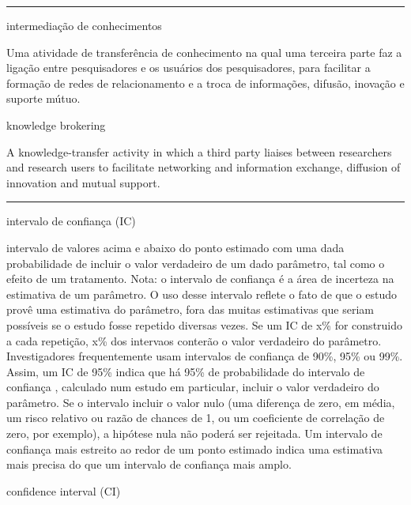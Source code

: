 \documentclass[
]{book}
\begin{document}
\begin{center}\rule{0.5\linewidth}{0.5pt}\end{center}

intermediação de conhecimentos

Uma atividade de transferência de conhecimento na qual uma terceira parte faz a ligação entre pesquisadores e os usuários dos pesquisadores, para facilitar a formação de redes de relacionamento e a troca de informações, difusão, inovação e suporte mútuo.

knowledge brokering

A knowledge-transfer activity in which a third party liaises between researchers and research users to facilitate networking and information exchange, diffusion of innovation and mutual support.

\begin{center}\rule{0.5\linewidth}{0.5pt}\end{center}

intervalo de confiança (IC)

intervalo de valores acima e abaixo do ponto estimado com uma dada probabilidade de incluir o valor verdadeiro de um dado parâmetro, tal como o efeito de um tratamento. Nota: o intervalo de confiança é a área de incerteza na estimativa de um parâmetro. O uso desse intervalo reflete o fato de que o estudo provê uma estimativa do parâmetro, fora das muitas estimativas que seriam possíveis se o estudo fosse repetido diversas vezes. Se um IC de x\% for construido a cada repetição, x\% dos intervaos conterão o valor verdadeiro do parâmetro. Investigadores frequentemente usam intervalos de confiança de 90\%, 95\% ou 99\%. Assim, um IC de 95\% indica que há 95\% de probabilidade do intervalo de confiança , calculado num estudo em particular, incluir o valor verdadeiro do parâmetro. Se o intervalo incluir o valor nulo (uma diferença de zero, em média, um risco relativo ou razão de chances de 1, ou um coeficiente de correlação de zero, por exemplo), a hipótese nula não poderá ser rejeitada. Um intervalo de confiança mais estreito ao redor de um ponto estimado indica uma estimativa mais precisa do que um intervalo de confiança mais amplo.

confidence interval (CI)
\end{document}

